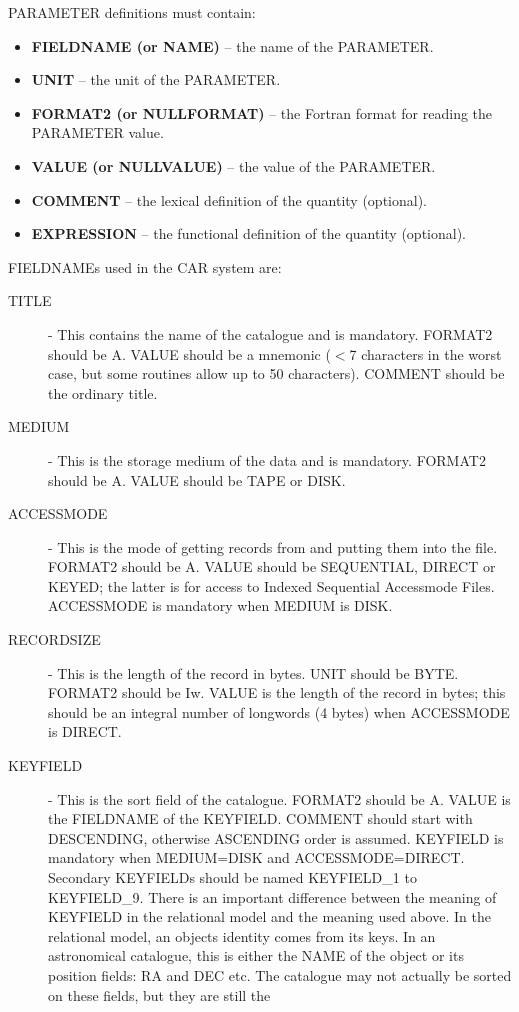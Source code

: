 PARAMETER definitions must contain:
\begin{itemize}
\item {\bf FIELDNAME (or NAME)} -- the name of the PARAMETER.
\item {\bf UNIT} -- the unit of the PARAMETER.
\item {\bf FORMAT2 (or NULLFORMAT)} -- the Fortran format for reading the
PARAMETER value.
\item {\bf VALUE (or NULLVALUE)} -- the value of the PARAMETER.
\item {\bf COMMENT} -- the lexical definition of the quantity (optional).
\item {\bf EXPRESSION} -- the functional definition of the quantity (optional).
\end{itemize}
FIELDNAMEs used in the CAR system are:
\begin{description}
\item [TITLE] -
This contains the name of the catalogue and is mandatory.
FORMAT2 should be A.
VALUE should be a mnemonic ($<$7 characters in the worst case, but some 
routines allow up to 50 characters).
COMMENT should be the ordinary title.
\item [MEDIUM] -
This is the storage medium of the data and is mandatory.
FORMAT2 should be A.
VALUE should be TAPE or DISK.
\item [ACCESSMODE] -
This is the mode of getting records from and putting them into the file.
FORMAT2 should be A.
VALUE should be SEQUENTIAL, DIRECT or KEYED; the latter is for access to
Indexed Sequential Accessmode Files.
ACCESSMODE is mandatory when MEDIUM is DISK.
\item [RECORDSIZE] -
This is the length of the record in bytes.
UNIT should be BYTE.
FORMAT2 should be Iw.
VALUE is the length of the record in bytes; this should be an integral
number of longwords (4 bytes) when ACCESSMODE is DIRECT.
\item [KEYFIELD] -
This is the sort field of the catalogue.
FORMAT2 should be A.
VALUE is the FIELDNAME of the KEYFIELD.
COMMENT should start with DESCENDING, otherwise ASCENDING order is assumed.
KEYFIELD is mandatory when MEDIUM=DISK and ACCESSMODE=DIRECT.
Secondary KEYFIELDs should be named KEYFIELD\_1 to KEYFIELD\_9.
There is an important difference between the meaning of KEYFIELD in the
relational model and the meaning used above.
In the relational model, an objects identity comes from its keys.
In an astronomical catalogue, this is either the NAME of the object or its
position fields: RA and DEC etc.
The catalogue may not actually be sorted on these fields, but they are still the

\end{description}
